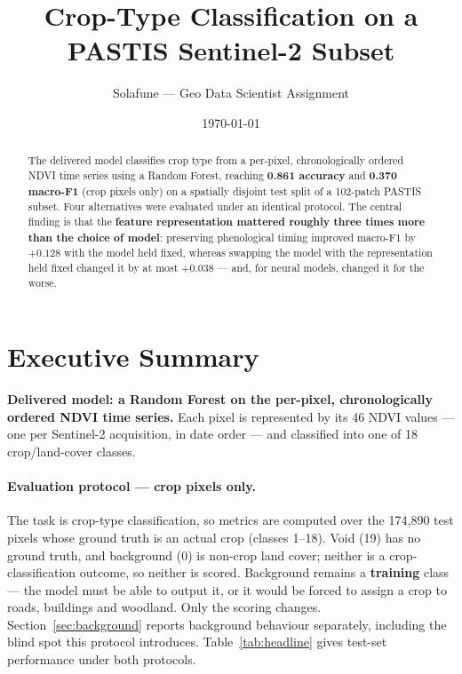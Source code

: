 \documentclass[11pt,a4paper]{article}
\title{\textbf{Crop-Type Classification on a PASTIS Sentinel-2 Subset}}
\author{Solafune --- Geo Data Scientist Assignment}
\date{\today}
\begin{document}
\maketitle

\begin{abstract}
\noindent
The delivered model classifies crop type from a per-pixel, chronologically
ordered NDVI time series using a Random Forest, reaching \textbf{0.861
accuracy} and \textbf{0.370 macro-F1} (crop pixels only) on a spatially
disjoint test split of a
102-patch PASTIS subset. Four alternatives were evaluated under an identical
protocol. The central finding is that the \textbf{feature representation
mattered roughly three times more than the choice of model}: preserving
phenological timing improved macro-F1 by $+0.128$ with the model held fixed,
whereas swapping the model with the representation held fixed changed it by at
most $+0.038$ --- and, for neural models, changed it for the worse.
\end{abstract}

\tableofcontents
\bigskip

\section{Executive Summary}\label{sec:summary}

\textbf{Delivered model: a Random Forest on the per-pixel, chronologically
ordered NDVI time series.} Each pixel is represented by its 46 NDVI values ---
one per Sentinel-2 acquisition, in date order --- and classified into one of 18
crop/land-cover classes.

\paragraph{Evaluation protocol --- crop pixels only.}
The task is crop-type classification, so metrics are computed over the
174{,}890 test pixels whose ground truth is an actual crop (classes 1--18).
Void (19) has no ground truth, and background (0) is non-crop land cover;
neither is a crop-classification outcome, so neither is scored. Background
remains a \textbf{training} class --- the model must be able to output it, or
it would be forced to assign a crop to roads, buildings and woodland. Only the
scoring changes. Section~\ref{sec:background} reports background behaviour
separately, including the blind spot this protocol introduces.
Table~\ref{tab:headline} gives test-set performance under both protocols.
\end{document}
